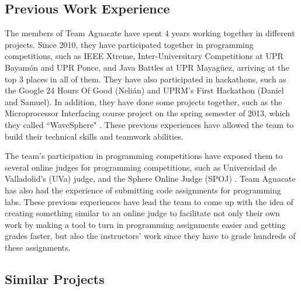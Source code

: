 
\subsection{Previous Work Experience}

The members of Team Aguacate have spent 4 years working together in different
projects. Since 2010, they have participated together in programming
competitions, such as IEEE Xtreme, Inter-Universitary Competitions at UPR
Bayamón and UPR Ponce, and Java Battles at UPR Mayagüez, arriving at the top 3
places in all of them. They have also participated in hackathons, such as the
Google 24 Hours Of Good (Nelián) and UPRM's First Hackathon (Daniel and Samuel).
In addition, they have done some projects together, such as the Microprocessor
Interfacing course project on the spring semester of 2013, which they called
``WaveSphere" \cite{Micro2}. These previous experiences have allowed the team to
build their technical skills and teamwork abilities.

The team's participation in programming competitions have exposed them to
several  online judges for programming competitions, such as Universidad de
Valladolid's (UVa) judge, \cite{UVA} and the Sphere Online Judge (SPOJ)
\cite{SPOJ}. Team Aguacate has also had the experience of submitting code
assignments for programming labs. These previous experiences have lead the team
to come up with the idea of creating something similar to an online judge to
facilitate not only their own work by making a tool to turn in programming
assignments easier and getting grades faster, but also the instructors' work
since they have to grade hundreds of these assignments.

\subsection{Similar Projects}

